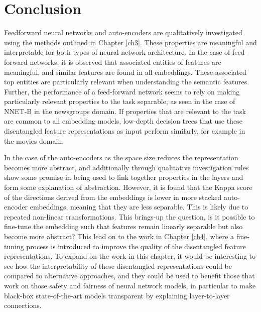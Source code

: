 \section{Conclusion} \label{ch5:conclusion}

Feedforward neural networks and auto-encoders are qualitatively investigated using the methods outlined in Chapter \ref{ch3}. These properties are meaningful and interpretable for both types of neural network architecture. In the case of feed-forward networks, it is observed that associated entities of features are meaningful, and similar features are found in all embeddings. These associated top entities are particularly relevant when understanding the semantic features. Further, the performance of a feed-forward network seems to rely on making particularly relevant properties to the task separable, as seen in the case of NNET-B in the newsgroups domain. If properties that are relevant to the task are common to all embedding models, low-depth decision trees that use these disentangled feature representations as input perform similarly, for example in the movies domain.  

In the case of the auto-encoders as the space size reduces the representation becomes more abstract, and additionally through qualitative investigation rules show some promise in being used to link together properties in the layers and form some explanation of abstraction. However, it is found that the Kappa score of the directions derived from the embeddings is lower in more stacked auto-encoder embeddings, meaning that they are less separable. This is likely due to repeated non-linear transformations. This brings-up the question, is it possible to fine-tune the embedding such that features remain linearly separable but also become more abstract? This lead on to the work  in Chapter \ref{ch4}, where a fine-tuning process is introduced to improve the quality of the disentangled feature representations. To expand on the work in this chapter, it would be interesting to see how the interpretability of these disentangled representations could be compared to alternative approaches, and they could be used to benefit those that work on those  safety and fairness of neural network models, in particular to make black-box state-of-the-art models transparent by  explaining layer-to-layer connections.




